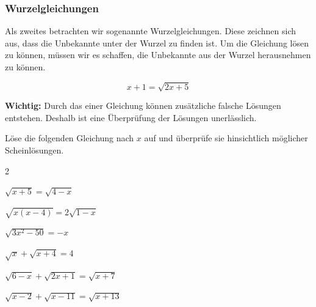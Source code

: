 \documentclass[11pt,oneside]{article}
\begin{document}
\subsubsection{Wurzelgleichungen}
	Als zweites betrachten wir sogenannte Wurzelgleichungen. Diese zeichnen sich aus, dass die Unbekannte unter der Wurzel zu finden ist. Um die Gleichung lösen zu können, müssen wir es schaffen, die Unbekannte aus der Wurzel herausnehmen zu können.
	\begin{beispiel}
		\[x+1=\sqrt{2x+5}\]
	\end{beispiel}
	\textbf{Wichtig: } Durch das  einer Gleichung können zusätzliche falsche Lösungen entstehen. Deshalb ist eine Überprüfung der Lösungen unerlässlich.\newline
	\begin{aufgabe}
		Löse die folgenden Gleichung nach $x$ auf und überprüfe sie hinsichtlich möglicher Scheinlösungen.
		\begin{enumerate}[label=\alph*)]\end{enumerate}
	\end{aufgabe}

\newpage
\end{document}
